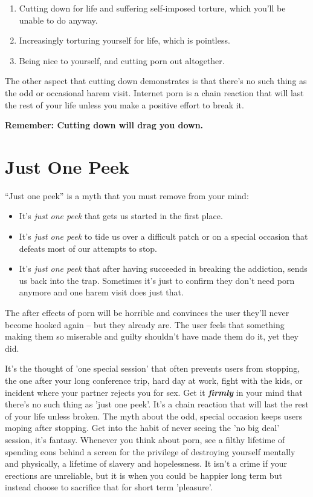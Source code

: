 \documentclass[
]{book}
\begin{document}
\begin{enumerate}
\def\labelenumi{\arabic{enumi}.}
\item
  Cutting down for life and suffering self-imposed torture, which you'll be unable to do anyway.
\item
  Increasingly torturing yourself for life, which is pointless.
\item
  Being nice to yourself, and cutting porn out altogether.
\end{enumerate}

The other aspect that cutting down demonstrates is that there's no such thing as the odd or occasional harem visit. Internet porn is a chain reaction that will last the rest of your life unless you make a positive effort to break it.

\textbf{Remember: Cutting down will drag you down.}

\hypertarget{just-one-peek}{%
\chapter{Just One Peek}\label{just-one-peek}}

``Just one peek'' is a myth that you must remove from your mind:

\begin{itemize}
\item
  It's \emph{just one peek} that gets us started in the first place.
\item
  It's \emph{just one peek} to tide us over a difficult patch or on a special occasion that defeats most of our attempts to stop.
\item
  It's \emph{just one peek} that after having succeeded in breaking the addiction, sends us back into the trap. Sometimes it's just to confirm they don't need porn anymore and one harem visit does just that.
\end{itemize}

The after effects of porn will be horrible and convinces the user they'll never become hooked again -- but they already are. The user feels that something making them so miserable and guilty shouldn't have made them do it, yet they did.

It's the thought of 'one special session' that often prevents users from stopping, the one after your long conference trip, hard day at work, fight with the kids, or incident where your partner rejects you for sex. Get it \textbf{\emph{firmly}} in your mind that there's no such thing as 'just one peek'. It's a chain reaction that will last the rest of your life unless broken. The myth about the odd, special occasion keeps users moping after stopping. Get into the habit of never seeing the 'no big deal' session, it's fantasy. Whenever you think about porn, see a filthy lifetime of spending eons behind a screen for the privilege of destroying yourself mentally and physically, a lifetime of slavery and hopelessness. It isn't a crime if your erections are unreliable, but it is when you could be happier long term but instead choose to sacrifice that for short term 'pleasure'.
\end{document}
